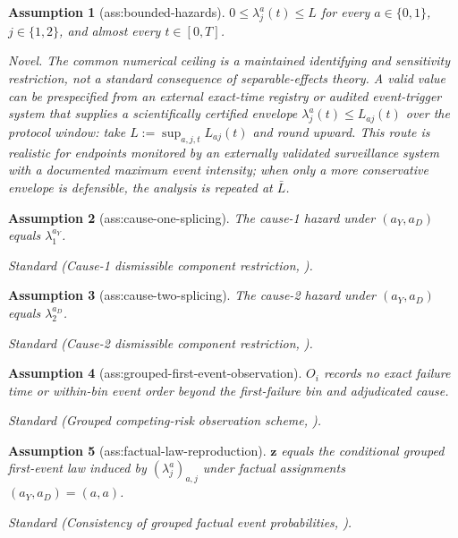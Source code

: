 \documentclass{article}
\newtheorem{assumption}{Assumption}
\begin{document}
\begin{assumption}[ass:bounded-hazards]\label{ass:bounded-hazards}
\(0\le\lambda_j^a(t)\le L\) for every \(a\in\{0,1\}\), \(j\in\{1,2\}\), and almost every \(t\in[0,T]\).
\par\smallskip\noindent\emph{Novel.} The common numerical ceiling is a maintained identifying and sensitivity restriction, not a standard consequence of separable-effects theory. A valid value can be prespecified from an external exact-time registry or audited event-trigger system that supplies a scientifically certified envelope \(\lambda_j^a(t)\le L_{aj}(t)\) over the protocol window: take \(L:=\sup_{a,j,t}L_{aj}(t)\) and round upward. This route is realistic for endpoints monitored by an externally validated surveillance system with a documented maximum event intensity; when only a more conservative envelope is defensible, the analysis is repeated at \(\bar L\).
\end{assumption}

\begin{assumption}[ass:cause-one-splicing]\label{ass:cause-one-splicing}
The cause-1 hazard under \((a_Y,a_D)\) equals \(\lambda_1^{a_Y}\).
\par\smallskip\noindent\emph{Standard} (Cause-1 dismissible component restriction, \cite{MartinussenStensrud2023}).
\end{assumption}

\begin{assumption}[ass:cause-two-splicing]\label{ass:cause-two-splicing}
The cause-2 hazard under \((a_Y,a_D)\) equals \(\lambda_2^{a_D}\).
\par\smallskip\noindent\emph{Standard} (Cause-2 dismissible component restriction, \cite{MartinussenStensrud2023}).
\end{assumption}

\begin{assumption}[ass:grouped-first-event-observation]\label{ass:grouped-first-event-observation}
\(O_i\) records no exact failure time or within-bin event order beyond the first-failure bin and adjudicated cause.
\par\smallskip\noindent\emph{Standard} (Grouped competing-risk observation scheme, \cite{MaathuisHudgens2011}).
\end{assumption}

\begin{assumption}[ass:factual-law-reproduction]\label{ass:factual-law-reproduction}
\(\mathbf z\) equals the conditional grouped first-event law induced by \((\lambda_j^a)_{a,j}\) under factual assignments \((a_Y,a_D)=(a,a)\).
\par\smallskip\noindent\emph{Standard} (Consistency of grouped factual event probabilities, \cite{StensrudYoungDidelezRobinsHernan2022}).
\end{assumption}
\end{document}
